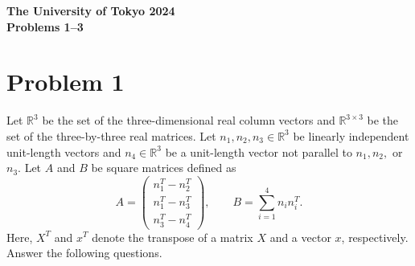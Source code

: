 \documentclass[10pt,a4paper]{article}
\begin{document}
\begin{center}
  {\Large \textbf{The University of Tokyo 2024}}\\[2mm]
  {\large \textbf{Problems 1--3}}
\end{center}

\section*{Problem 1}

Let $\mathbb{R}^3$ be the set of the three-dimensional real column vectors and $\mathbb{R}^{3\times 3}$ be the set of the three-by-three real matrices. Let $n_1,n_2,n_3\in\mathbb{R}^3$ be linearly independent unit-length vectors and $n_4\in\mathbb{R}^3$ be a unit-length vector not parallel to $n_1,n_2,$ or $n_3$. Let $A$ and $B$ be square matrices defined as
\[
  A=
  \begin{pmatrix}
    n_1^T-n_2^T\\
    n_1^T-n_3^T\\
    n_3^T-n_4^T
  \end{pmatrix},
  \qquad
  B=\sum_{i=1}^4 n_in_i^T.
\]
Here, $X^T$ and $x^T$ denote the transpose of a matrix $X$ and a vector $x$, respectively. Answer the following questions.
\end{document}
